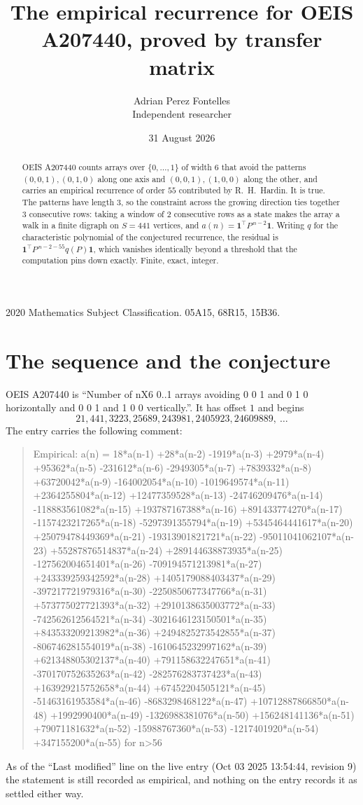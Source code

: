 \documentclass[11pt,a4paper]{article}
\title{The empirical recurrence for OEIS A207440, proved by transfer matrix}
\author{Adrian Perez Fontelles\\ \small Independent researcher}
\date{31 August 2026}
\theoremstyle{plain}
\theoremstyle{definition}
\begin{document}
\maketitle

\begin{abstract}
OEIS A207440 counts arrays over $\{0,\dots,1\}$ of width $6$ that avoid the patterns
$(0,0,1), (0,1,0)$ along one axis and $(0,0,1), (1,0,0)$ along the other, and carries an empirical recurrence of
order $55$ contributed by R.~H.~Hardin. It is true. The patterns have length $3$, so
the constraint across the growing direction ties together $3$ consecutive rows: taking a
window of $2$ consecutive rows as a state makes the array a walk in a finite digraph
on $S=441$ vertices, and $a(n)=\mathbf{1}^{\!\top}P^{\,n-2}\mathbf{1}$. Writing $q$
for the characteristic polynomial of the conjectured recurrence, the residual is
$\mathbf{1}^{\!\top}P^{\,n-2-55}q(P)\mathbf{1}$, which vanishes identically
beyond a threshold that the computation pins down exactly. Finite, exact, integer.
\end{abstract}

\noindent\small 2020 Mathematics Subject Classification. 05A15, 68R15, 15B36.\normalsize

\section{The sequence and the conjecture}

OEIS A207440 is ``Number of nX6 0..1 arrays avoiding 0 0 1 and 0 1 0 horizontally and 0 0 1 and 1 0 0 vertically.''. It has offset
$1$ and begins
\[
21, 441, 3223, 25689, 243981, 2405923, 24609889,\ \dots
\]
The entry carries the following comment:
\begin{quote}\small
Empirical: a(n) = 18*a(n-1) +28*a(n-2) -1919*a(n-3) +2979*a(n-4) +95362*a(n-5) -231612*a(n-6) -2949305*a(n-7) +7839332*a(n-8) +63720042*a(n-9) -164002054*a(n-10) -1019649574*a(n-11) +2364255804*a(n-12) +12477359528*a(n-13) -24746209476*a(n-14) -118883561082*a(n-15) +193787167388*a(n-16) +891433774270*a(n-17) -1157423217265*a(n-18) -5297391355794*a(n-19) +5345464441617*a(n-20) +25079478449369*a(n-21) -19313901821721*a(n-22) -95011041062107*a(n-23) +55287876514837*a(n-24) +289144638873935*a(n-25) -127562004651401*a(n-26) -709194571213981*a(n-27) +243339259342592*a(n-28) +1405179088403437*a(n-29) -397217721979316*a(n-30) -2250850677347766*a(n-31) +573775027721393*a(n-32) +2910138635003772*a(n-33) -742562612564521*a(n-34) -3021646123150501*a(n-35) +843533209213982*a(n-36) +2494825273542855*a(n-37) -806746281554019*a(n-38) -1610645232997162*a(n-39) +621348805302137*a(n-40) +791158632247651*a(n-41) -370170752635263*a(n-42) -282576283737423*a(n-43) +163929215752658*a(n-44) +67452204505121*a(n-45) -51463161953584*a(n-46) -8683298468122*a(n-47) +10712887866850*a(n-48) +1992990400*a(n-49) -1326988381076*a(n-50) +156248141136*a(n-51) +79071181632*a(n-52) -15988767360*a(n-53) -1217401920*a(n-54) +347155200*a(n-55) for n>56
\end{quote}
As of the ``Last modified'' line on the live entry (Oct 03 2025 13:54:44, revision
9) the statement is still recorded as empirical, and nothing on the entry
records it as settled either way.
\end{document}
